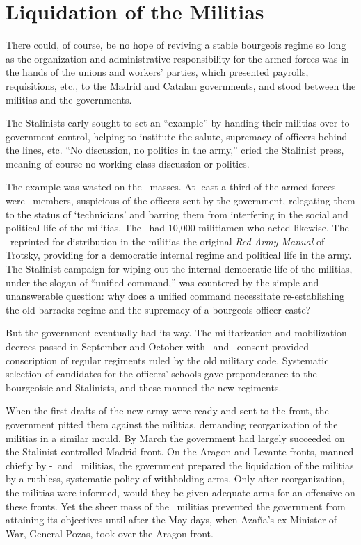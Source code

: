 \section{Liquidation of the Militias}

There could, of course, be no hope of reviving a stable bourgeois regime so long as the organization and administrative responsibility for the armed forces was in the hands of the unions and workers’ parties, which presented payrolls, requisitions, etc., to the Madrid and Catalan governments, and stood between the militias and the governments.

The Stalinists early sought to set an ``example'' by handing their militias over to government control, helping to institute the salute, supremacy of officers behind the lines, etc. ``No discussion, no politics in the army,'' cried the Stalinist press, meaning of course no working-class discussion or politics.

The example was wasted on the \CNT\ masses. At least a third of the armed forces were \CNT\ members, suspicious of the officers sent by the government, relegating them to the status of ‘technicians’ and barring them from interfering in the social and political life of the militias. The \POUM\ had 10,000 militiamen who acted likewise. The \POUM\ reprinted for distribution in the militias the original \emph{Red Army Manual} of Trotsky, providing for a democratic internal regime and political life in the army. The Stalinist campaign for wiping out the internal democratic life of the militias, under the slogan of ``unified command,'' was countered by the simple and unanswerable question: why does a unified command necessitate re-establishing the old barracks regime and the supremacy of a bourgeois officer caste?

But the government eventually had its way. The militarization and mobilization decrees passed in September and October with \CNT\ and \POUM\ consent provided conscription of regular regiments ruled by the old military code. Systematic selection of candidates for the officers’ schools gave preponderance to the bourgeoisie and Stalinists, and these manned the new regiments.

When the first drafts of the new army were ready and sent to the front, the government pitted them against the militias, demanding reorganization of the militias in a similar mould. By March the government had largely succeeded on the Stalinist-controlled Madrid front. On the Aragon and Levante fronts, manned chiefly by \CNT-\FAI\ and \POUM\ militias, the government prepared the liquidation of the militias by a ruthless, systematic policy of withholding arms. Only after reorganization, the militias were informed, would they be given adequate arms for an offensive on these fronts. Yet the sheer mass of the \CNT\ militias prevented the government from attaining its objectives until after the May days, when Azaña’s ex-Minister of War, General Pozas, took over the Aragon front.

